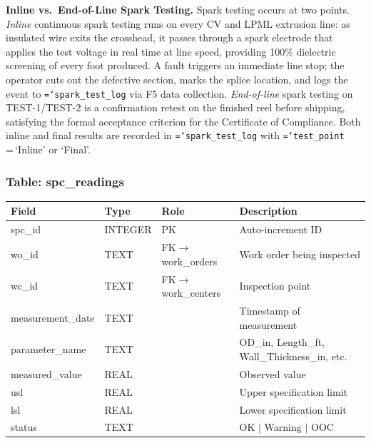 \documentclass[11pt]{article}
\newcommand{\tfield}[1]{\texttt{\hyphenchar\font=`\-\relax #1}}
\begin{document}
\textbf{Inline vs.\ End-of-Line Spark Testing.}
Spark testing occurs at two points.  \emph{Inline} continuous spark testing runs on every CV and LPML extrusion line: as insulated wire exits the crosshead, it passes through a spark electrode that applies the test voltage in real time at line speed, providing 100\% dielectric screening of every foot produced.  A fault triggers an immediate line stop; the operator cuts out the defective section, marks the splice location, and logs the event to \tfield{spark\_test\_log} via F5 data collection.  \emph{End-of-line} spark testing on TEST-1/TEST-2 is a confirmation retest on the finished reel before shipping, satisfying the formal acceptance criterion for the Certificate of Compliance.  Both inline and final results are recorded in \tfield{spark\_test\_log} with \tfield{test\_point}\,=\,`Inline' or `Final'.

\subsubsection*{Table: spc\_readings}
\begin{table}[H]\centering\small
\begin{tabular}{@{} l l l L{5.0cm} @{}}
\toprule
\textbf{Field} & \textbf{Type} & \textbf{Role} & \textbf{Description} \\
\midrule
spc\_id           & INTEGER & PK  & Auto-increment ID \\
wo\_id            & TEXT    & FK$\to$work\_orders & Work order being inspected \\
wc\_id            & TEXT    & FK$\to$work\_centers & Inspection point \\
measurement\_date & TEXT    &     & Timestamp of measurement \\
parameter\_name   & TEXT    &     & OD\_in, Length\_ft, Wall\_Thickness\_in, etc. \\
measured\_value   & REAL    &     & Observed value \\
usl              & REAL    &     & Upper specification limit \\
lsl              & REAL    &     & Lower specification limit \\
status           & TEXT    &     & OK $\mid$ Warning $\mid$ OOC \\
\bottomrule
\end{tabular}
\end{table}
\end{document}

